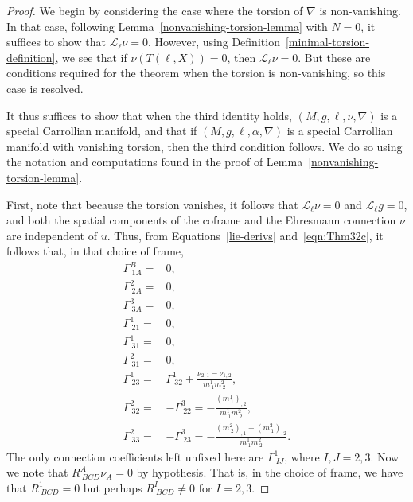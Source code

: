 \documentclass{article}
\newcommand{\ai}{A}
\newcommand{\bb}{B}
\newcommand{\cc}{C}
\newcommand{\dd}{D}
\newcommand{\ii}{I}
\newcommand{\jj}{J}
\theoremstyle{definition}
\theoremstyle{remark}
\begin{document}
\begin{proof}

We begin by considering the case where the torsion of $\nabla$ is non-vanishing. In that case, following Lemma~\ref{nonvanishing-torsion-lemma} with $N = 0$, it suffices to show that $\mathcal{L}_{\ell} \nu = 0$. However, using Definition~\ref{minimal-torsion-definition}, we see that if $\nu(T(\ell,X)) = 0$, then $\mathcal{L}_{\ell} \nu = 0$. But these are conditions required for the theorem when the torsion is non-vanishing, so this case is resolved.

It thus suffices to show that when the third identity holds, $(M,g,\ell,\nu,\nabla)$ is a special Carrollian manifold, and that if $(M,g,\ell,\alpha,\nabla)$ is a special Carrollian manifold with vanishing torsion, then the third condition follows. We do so using the notation and computations found in the proof of Lemma~\ref{nonvanishing-torsion-lemma}.

First, note that because the torsion vanishes, it follows that $\mathcal{L}_{\ell} \nu = 0$ and $\mathcal{L}_{\ell} g = 0$, and both the spatial components of the coframe and the Ehresmann connection $\nu$ are independent of $u$.  Thus, from Equations~\ref{lie-derivs} and~\ref{eqn:Thm32c}, it follows that, in that choice of frame,
    \begin{equation}
    \begin{aligned}
        \Gamma^{B}_{~1A} =& 0, \\
        \Gamma^{2}_{~2A} =& 0, \\
        \Gamma^{3}_{~3A} =& 0, \\
        \Gamma^1_{~21} =& 0, \\ 
        \Gamma^1_{~31} =& 0, \\
         \Gamma^2_ {~31} =& 0, \\
         \Gamma^1_{~23} =& \Gamma^1_{~32} + \frac{\nu_{2,1}-\nu_{1,2}}{m^1_{~1} m^2_{~2}}, \\
         \Gamma^2_{~32} =& -\Gamma^3_{~22} = -\frac{  (m^1_{~1})_{,2}}{m^1_{~1} m^2_{~2}}, \\
       \Gamma^2_{~33} = & -\Gamma^3_{~23} = - \frac{ (m^2_{~2})_{,1}-(m^2_{~1})_{,2}}{m^1_{~1} m^2_{~2}}.
    \end{aligned} \label{eqn:Thm34-coeffs}
    \end{equation}
The only connection coefficients left unfixed here are $\Gamma^1_{~\ii \jj}$, where $\ii,\jj = 2,3$.
Now we note that $R^\ai_{~\bb \cc \dd}\nu_\ai = 0$ by hypothesis. That is, in the choice of frame, we have that $R^{1}_{~\bb\cc\dd} = 0$ but perhaps $R^\ii_{~\bb\cc\dd} \neq 0$ for $\ii = 2,3$.


\end{proof}
\end{document}
